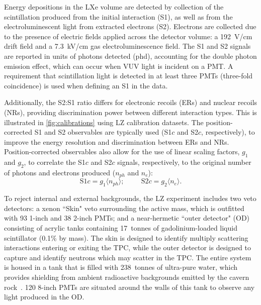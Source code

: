 \documentclass[reprint, showpacs,
preprintnumbers,
amsmath,amssymb,
aps, floatfix,
superscriptaddress,
prd, nofootinbib]{revtex4-1}
\begin{document}
Energy depositions in the LXe volume are detected by collection of the scintillation produced from the initial interaction (S1), as well as from the electroluminescent light from extracted electrons (S2).
Electrons are collected due to the presence of electric fields applied across the detector volume: a 192~V/cm drift field and a 7.3~kV/cm gas electroluminescence field. 
The S1 and S2 signals are reported in units of photons detected (phd), accounting for the double photon emission effect, which can occur when VUV light is incident on a PMT. A requirement that scintillation light is detected in at least three PMTs (three-fold coincidence) is used when defining an S1 in the data.
\par
Additionally, the S2:S1 ratio differs for electronic recoils (ERs) and nuclear recoils (NRs), providing discrimination power between different interaction types.
This is illustrated in \autoref{fig:calibrations} using LZ calibration datasets.
The position-corrected S1 and S2 observables are typically used (S1$c$ and S2$c$, respectively),  to improve the energy resolution and discrimination between ERs and NRs. 
Position-corrected observables also allow for the use of linear scaling factors, $g_1$ and $g_2$, to correlate the S1$c$ and S2$c$ signals, respectively, to the original number of photons and electrons produced ($n_{ph}$ and $n_e$): \begin{equation}
    \text{S1}c = g_1\langle n_{ph} \rangle; \hspace{1cm} \text{S2}c = g_2 \langle n_e \rangle. 
\label{eq:S1S2scale}
\end{equation}
\par
To reject internal and external backgrounds, the LZ experiment includes two veto detectors: a xenon ``Skin" veto surrounding the active mass, which is outfitted with 93 1-inch and 38 2-inch PMTs; and a near-hermetic ``outer detector" (OD) consisting of acrylic tanks containing 17~tonnes of gadolinium-loaded liquid scintillator (0.1\% by mass). 
The skin is designed to identify multiply scattering interactions entering or exiting the TPC, while the outer detector is designed to capture and identify neutrons which may scatter in the TPC. 
The entire system is housed in a tank that is filled with 238~tonnes of ultra-pure water, which provides shielding from ambient radioactive backgrounds emitted by the cavern rock~\cite{LZ:Experiment_2020, LZ:TDR_2017}.
120 8-inch PMTs are situated around the walls of this tank to observe any light produced in the OD.
\par
\end{document}
